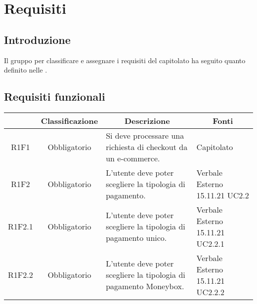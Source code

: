\section{Requisiti} \label{section:requisiti}

\subsection{Introduzione}
Il gruppo \groupName{} per classificare e assegnare i requisiti del capitolato ha seguito quanto definito nelle \docNameVersionNdP{}.

\subsection{Requisiti funzionali} \label{subsection:requisiti_funzionali}
\begin{table}[H]
    \centering
    \renewcommand{\arraystretch}{1.8}
    \begin{tabular}{c | c | p{6cm} | p{4.1cm}}
        \rowcolor[HTML]{125E28}
        \multicolumn{1}{c}{\color[HTML]{FFFFFF} \textbf{Codice}}          &
        \multicolumn{1}{c}{\color[HTML]{FFFFFF} \textbf{Classificazione}} &
        \multicolumn{1}{c}{\color[HTML]{FFFFFF} \textbf{Descrizione}}     &
        \multicolumn{1}{c}{\color[HTML]{FFFFFF} \textbf{Fonti}}                                                                                                                                                     \\
        \hline
        R1F1                                                              & Obbligatorio & Si deve processare una richiesta di checkout da un e-commerce\glo{}.                  & Capitolato                       \\
        R1F2                                                              & Obbligatorio & L'utente deve poter scegliere la tipologia di pagamento.                              & Verbale Esterno 15.11.21 UC2.2   \\
        R1F2.1                                                            & Obbligatorio & L'utente deve poter scegliere la tipologia di pagamento unico.                        & Verbale Esterno 15.11.21 UC2.2.1 \\
        R1F2.2                                                            & Obbligatorio & L'utente deve poter scegliere la tipologia di pagamento Moneybox\glo{}.               & Verbale Esterno 15.11.21 UC2.2.2 \\

\end{tabular}
\end{table}
